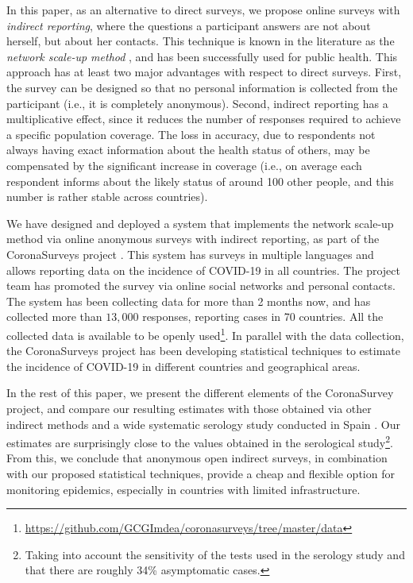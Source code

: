 \documentclass[sigconf]{acmart}
\newcommand{\af}[1]{{#1}}
\begin{document}
In this paper, as an alternative to direct surveys, we propose \af{online} surveys with \textit{indirect reporting}, where the questions a participant answers are not about herself, but about her contacts. 
This technique is known in the literature as the \emph{network scale-up method} \cite{bernard1991estimating,bernard2010counting}, and has been successfully used for public health.
This approach has at least two major advantages with respect to direct surveys. First, the survey can be designed so that no personal information is collected from the participant (i.e., it is completely anonymous). Second, indirect reporting has a multiplicative effect, since it reduces the number of responses required to achieve a specific population coverage. The loss in accuracy, due to respondents not always having exact information about the health status of others, may be compensated by the significant increase in coverage (i.e., on average each respondent informs about the likely status of around 100 other \af{people, and this number is rather stable across countries}).

We have designed and deployed a system that implements the network scale-up method via \af{online} anonymous surveys with indirect reporting, as part of the CoronaSurveys project \cite{CoronaSurveys}. This system has surveys in multiple languages and allows reporting data on the incidence of COVID-19 in all countries. \af{The project team has promoted the survey via online social networks and personal contacts. The system} has been collecting data for more than 2 months now, and has collected more than $13,000$ responses, reporting cases in 70 countries. All the collected data is available to be openly used\footnote{\url{https://github.com/GCGImdea/coronasurveys/tree/master/data}}. In parallel with the data collection, the CoronaSurveys project has been developing statistical techniques to estimate the incidence of COVID-19 in different countries and geographical areas.

In the rest of this paper, we present the different elements of the CoronaSurvey project, and compare our resulting estimates with those obtained via other indirect methods and a wide systematic serology study conducted in Spain \cite{ENEcovid19}. Our estimates are surprisingly close to the values obtained in the serological study\footnote{\af{Taking into account the sensitivity of the tests used in the serology study and that there are roughly 34\% asymptomatic cases.}}. From this, we conclude that  
anonymous open indirect surveys, in combination with our proposed statistical techniques, provide a cheap and flexible option for monitoring
epidemics, especially in countries with limited infrastructure.
\end{document}
